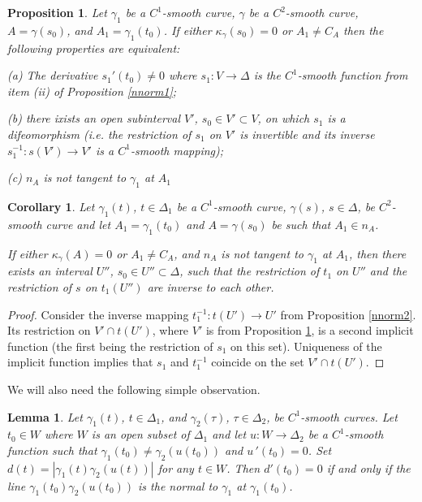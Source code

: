 \documentclass[a4paper,12pt]{amsart}
\newtheorem{lemma}[thm]{Lemma}
\newtheorem{prop}[thm]{Proposition}
\newtheorem{cor}[thm]{Corollary}
\def\g{\gamma}
\begin{document}
\begin{prop} \label{nnorm3}
Let $\g_1$ be a $C^1$-smooth curve, $\g$ be a $C^2$-smooth curve, $A =\g(s_0)$, and
$A_1=\g_1(t_0)$.
If either $\kappa_{\g}(s_0)=0$ or $A_1\neq C_A$ then  the following properties are equivalent:

(a) The derivative $s_1'(t_0) \neq 0$ where  $s_1: V \rightarrow \Delta$ is the $C^1$-smooth function from item (ii) of Proposition
\ref{nnorm1};

(b) there ixists an open subinterval $V'$, $s_0 \in V'\subset V$, on which $s_1$ is a difeomorphism (i.e. the restriction of $s_1$ on $V'$ is invertible and its inverse $s_1^{-1}: s(V') \rightarrow V' $  is a  $C^1$-smooth mapping);

(c) $n_A$ is not  tangent to $\g_1$  at $A_1$

\end{prop}

\begin{cor} \label{homo}
 Let $\g_1(t)$, $t \in \Delta_1$ be a $C^1$-smooth curve, $\g(s)$,  $s \in \Delta$, be  $C^2$-smooth curve and let $A_1= \g_1(t_0)$ and $A= \g(s_0)$ be such that $A_1 \in n_A$.

If either $\kappa_{\g}(A) = 0$ or $A_1\neq C_A$, and $n_A$ is not tangent to $\g_1$ at $A_1$,  then there exists an interval $U''$,  $s_0 \in U'' \subset \Delta$, such that the restriction of $t_1$ on $U''$ and the restriction of $s$ on $t_1(U'')$ are inverse to each other.
\end{cor}

\begin{proof}
Consider the inverse mapping $t_1^{-1}:t(U') \rightarrow U'$ from Proposition \ref{nnorm2}. Its restriction on $V' \cap t(U')$, where $V'$ is from Proposition \ref{nnorm3}, is a second implicit function (the first being the restriction of $s_1$ on this set). Uniqueness of the implicit function implies that $s_1$ and $t_1^{-1}$ coincide on the set $V' \cap t(U')$.

\end{proof}

We will also need the following simple observation.

\begin{lemma}\label{lem} Let $\g_1(t)$, $t \in \Delta_1$, and $\g_2(\tau)$, $ \tau \in \Delta_2$, be $C^1$-smooth curves. Let $t_0 \in W$ where
$W$ is an open subset of $\Delta_1$ and let
$u:W \to \Delta_2$ be a $C^1$-smooth function such that $\g_1(t_0) \neq \g_2(u(t_0))$ and $u\,'(t_0)=0$.
Set $d(t)= |\g_1(t)\g_2(u(t))|$ for any $t \in W$.
Then $d'(t_0)=0$ if and only if the line
$\g_1(t_0)\g_2(u(t_0))$ is the normal to $\g_1$ at $\g_1(t_0)$.
\end{lemma}
\end{document}
